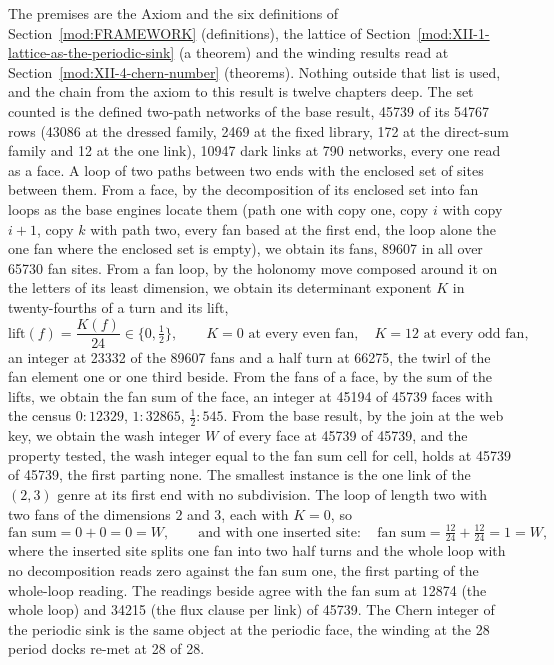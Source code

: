 \begin{chproof}[census]
The premises are the Axiom and the six definitions of Section~\ref{mod:FRAMEWORK} (definitions), the lattice of Section~\ref{mod:XII-1-lattice-as-the-periodic-sink} (a theorem) and the winding results read at Section~\ref{mod:XII-4-chern-number} (theorems). Nothing outside that list is used, and the chain from the axiom to this result is twelve chapters deep.
The set counted is the defined two-path networks of the base result, 45739 of its 54767 rows (43086 at the dressed family, 2469 at the fixed library, 172 at the direct-sum family and 12 at the one link), 10947 dark links at 790 networks, every one read as a face. A loop of two paths between two ends with the enclosed set of sites between them. From a face, by the decomposition of its enclosed set into fan loops as the base engines locate them (path one with copy one, copy $i$ with copy $i+1$, copy $k$ with path two, every fan based at the first end, the loop alone the one fan where the enclosed set is empty), we obtain its fans, 89607 in all over 65730 fan sites. From a fan loop, by the holonomy move composed around it on the letters of its least dimension, we obtain its determinant exponent $K$ in twenty-fourths of a turn and its lift,
\begin{equation}
\text{lift}(f) = \frac{K(f)}{24} \in \{0, \tfrac{1}{2}\}, \qquad K = 0 \text{ at every even fan}, \quad K = 12 \text{ at every odd fan},
\end{equation}
an integer at 23332 of the 89607 fans and a half turn at 66275, the twirl of the fan element one or one third beside. From the fans of a face, by the sum of the lifts, we obtain the fan sum of the face, an integer at 45194 of 45739 faces with the census $0\!:\!12329$, $1\!:\!32865$, $\tfrac{1}{2}\!:\!545$. From the base result, by the join at the web key, we obtain the wash integer $W$ of every face at 45739 of 45739, and the property tested, the wash integer equal to the fan sum cell for cell, holds at 45739 of 45739, the first parting none. The smallest instance is the one link of the $(2,3)$ genre at its first end with no subdivision. The loop of length two with two fans of the dimensions $2$ and $3$, each with $K = 0$, so
\begin{equation}
\text{fan sum} = 0 + 0 = 0 = W, \qquad \text{and with one inserted site}: \quad \text{fan sum} = \tfrac{12}{24} + \tfrac{12}{24} = 1 = W ,
\end{equation}
where the inserted site splits one fan into two half turns and the whole loop with no decomposition reads zero against the fan sum one, the first parting of the whole-loop reading. The readings beside agree with the fan sum at 12874 (the whole loop) and 34215 (the flux clause per link) of 45739. The Chern integer of the periodic sink is the same object at the periodic face, the winding at the 28 period docks re-met at 28 of 28.

\end{chproof}
